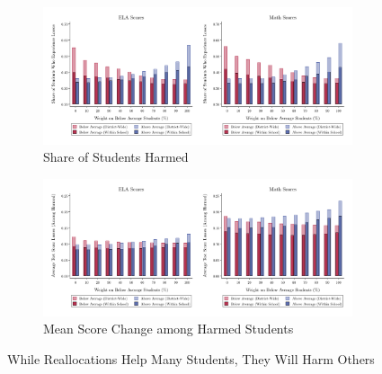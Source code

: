 \documentclass[12pt]{article}
\theoremstyle{definition}
\theoremstyle{definition}
\theoremstyle{definition}
\theoremstyle{definition}
\begin{document}
\begin{figure}[htpb]
\centering
\begin{subfigure}{\textwidth}
\centering
\includegraphics[width=.9\textwidth]{Working_Paper/test_figures/A4a_winlose.pdf}
    \caption{Share of Students Harmed}
 
\end{subfigure}

\begin{subfigure}{\textwidth}
\centering
\includegraphics[width=.9\textwidth]{Working_Paper/test_figures/A4b_losssize.pdf}
    \caption{Mean Score Change among Harmed Students}
 
\end{subfigure}

    \caption{While Reallocations Help Many Students, They Will Harm Others}
    \label{fig:harms}
\end{figure}
\end{document}
